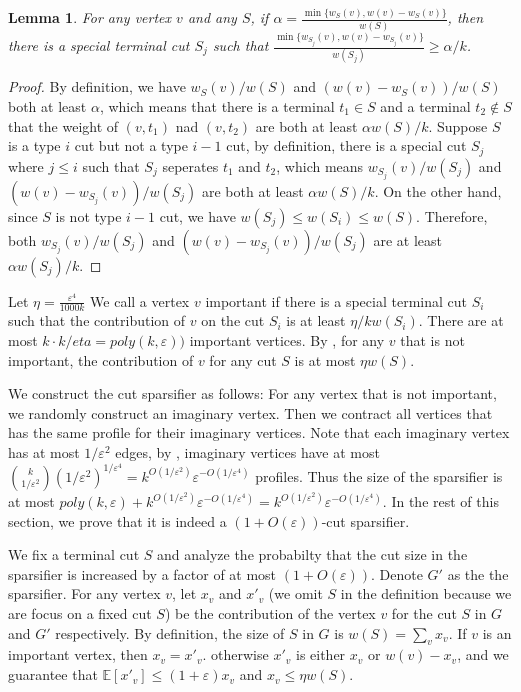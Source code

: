 \documentclass[11pt]{article}
\newtheorem{lemma}[theorem]{Lemma}
\theoremstyle{definition}
\newcommand{\eps}{{\varepsilon}}
\def\ex#1{{\mathbb{E}}\left[ #1 \right]}
\newcounter{note}
\begin{document}
\begin{lemma} \label{lem:contribution}
    For any vertex $v$ and any $S$, if $\alpha = \frac{\min \{w_S(v),w(v)-w_S(v)\}}{w(S)}$, then there is a special terminal cut $S_j$ such that $\frac{\min \{w_{S_j}(v),w(v)-w_{S_j}(v)\}}{w(S_j)} \ge \alpha/k$.
\end{lemma}

\begin{proof}
    By definition, we have $w_S(v)/w(S)$ and $(w(v)-w_S(v))/w(S)$ both at least $\alpha$, which means that there is a terminal $t_1 \in S$ and a terminal $t_2 \notin S$ that the weight of $(v,t_1)$ nad $(v,t_2)$ are both at least $\alpha w(S)/k$. Suppose $S$ is a type $i$ cut but not a type $i-1$ cut, by definition, there is a special cut $S_j$ where $j \le i$ such that $S_j$ seperates $t_1$ and $t_2$, which means $w_{S_j}(v)/w(S_j)$ and $(w(v)-w_{S_j}(v))/w(S_j)$ are both at least $\alpha w(S)/k$. On the other hand, since $S$ is not type $i-1$ cut, we have $w(S_j) \le w(S_i) \le w(S)$. Therefore, both $w_{S_j}(v)/w(S_j)$ and $(w(v)-w_{S_j}(v))/w(S_j)$ are at least $\alpha w(S_j)/k$.
\end{proof}

Let $\eta = \frac{\eps^4}{1000k}$ We call a vertex $v$ important if there is a special terminal cut $S_i$ such that the contribution of $v$ on the cut $S_i$ is at least $\eta/k w(S_i)$. There are at most $k \cdot k/eta  = poly(k,\eps))$ important vertices. By , for any $v$ that is not important, the contribution of $v$ for any cut $S$ is at most $\eta w(S)$. 

We construct the cut sparsifier as follows: For any vertex that is not important, we randomly construct an imaginary vertex. Then we contract all vertices that has the same profile for their imaginary vertices. Note that each imaginary vertex has at most $1/\eps^2$ edges, by , imaginary vertices have at most $\binom{k}{1/\eps^2} (1/\eps^2)^{1/\eps^4} = k^{O(1/\eps^2)}\eps^{-O(1/\eps^4)}$ profiles. Thus the size of the sparsifier is at most $poly(k,\eps) + k^{O(1/\eps^2)}\eps^{-O(1/\eps^4)} = k^{O(1/\eps^2)}\eps^{-O(1/\eps^4)}$. In the rest of this section, we prove that it is indeed a $(1+O(\eps))$-cut sparsifier.

We fix a terminal cut $S$ and analyze the probabilty that the cut size in the sparsifier is increased by a factor of at most $(1+O(\eps))$. Denote $G'$ as the the sparsifier. For any vertex $v$, let $x_v$ and $x'_v$ (we omit $S$ in the definition because we are focus on a fixed cut $S$) be the contribution of the vertex $v$ for the cut $S$ in $G$ and $G'$ respectively. By definition, the size of $S$ in $G$ is $w(S) = \sum_v x_v$. If $v$ is an important vertex, then $x_v = x'_v$. otherwise $x'_v$ is either $x_v$ or $w(v)-x_v$, and we guarantee that $\ex{x'_v} \le (1+\eps)x_v$ and $x_v \le \eta w(S)$.
\end{document}

